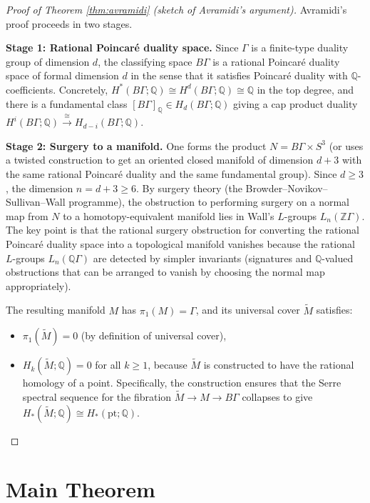 \documentclass[12pt]{article}
\theoremstyle{definition}
\begin{document}
\begin{proof}[Proof of Theorem \ref{thm:avramidi} (sketch of Avramidi's argument)]
Avramidi's proof proceeds in two stages.

\textbf{Stage 1: Rational Poincar\'e duality space.}
Since $\Gamma$ is a finite-type duality group of dimension $d$, the classifying space
$B\Gamma$ is a rational Poincar\'e duality space of formal dimension $d$ in the sense
that it satisfies Poincar\'e duality with $\mathbb{Q}$-coefficients.  Concretely,
$H^*(B\Gamma;\mathbb{Q}) \cong H^d(B\Gamma;\mathbb{Q}) \cong \mathbb{Q}$ in the top degree,
and there is a fundamental class $[B\Gamma]_\mathbb{Q} \in H_d(B\Gamma;\mathbb{Q})$ giving a
cap product duality $H^i(B\Gamma;\mathbb{Q}) \xrightarrow{\cong} H_{d-i}(B\Gamma;\mathbb{Q})$.

\textbf{Stage 2: Surgery to a manifold.}
One forms the product $N = B\Gamma \times S^3$ (or uses a twisted construction to get an
oriented closed manifold of dimension $d+3$ with the same rational Poincar\'e duality and
the same fundamental group).  Since $d \geq 3$, the dimension $n = d + 3 \geq 6$.
By surgery theory (the Browder--Novikov--Sullivan--Wall programme), the obstruction to
performing surgery on a normal map from $N$ to a homotopy-equivalent manifold lies in
Wall's $L$-groups $L_n(\mathbb{Z}\Gamma)$.  The key point is that the rational surgery
obstruction for converting the rational Poincar\'e duality space into a topological
manifold vanishes because the rational $L$-groups $L_n(\mathbb{Q}\Gamma)$ are detected by
simpler invariants (signatures and $\mathbb{Q}$-valued obstructions that can be arranged to
vanish by choosing the normal map appropriately).

The resulting manifold $M$ has $\pi_1(M) = \Gamma$, and its universal cover
$\widetilde{M}$ satisfies:
\begin{itemize}
  \item $\pi_1(\widetilde{M}) = 0$ (by definition of universal cover),
  \item $H_k(\widetilde{M};\mathbb{Q}) = 0$ for all $k \geq 1$, because $\widetilde{M}$
    is constructed to have the rational homology of a point.  Specifically, the
    construction ensures that the Serre spectral sequence for the fibration
    $\widetilde{M} \to M \to B\Gamma$ collapses to give $H_*(\widetilde{M};\mathbb{Q})
    \cong H_*(\mathrm{pt};\mathbb{Q})$.
\end{itemize}
\end{proof}

\section{Main Theorem}
\end{document}
